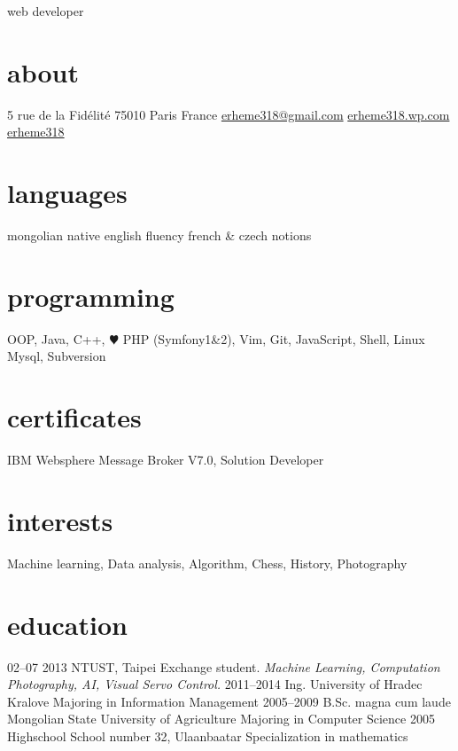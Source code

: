 \documentclass[backend=biber, print]{friggeri-cv}
\begin{document}
       {web developer}


\begin{aside}
  \section{about}
    5 rue de la Fidélité
    75010 Paris
    France
    \href{mailto:erheme318@gmail.com}{erheme318@gmail.com}
    \href{http://erheme318.wordpress.com}{erheme318.wp.com}
    \href{http://github.com/erheme318}{erheme318}
  \section{languages}
    mongolian native
    english fluency
    french \& czech notions
  \section{programming}
    {OOP,
    Java, C++, \color{red} $\varheartsuit$} PHP (Symfony1\&2), Vim, Git, JavaScript, Shell, Linux
    Mysql, Subversion
  \section{certificates}
    IBM Websphere Message Broker V7.0, Solution Developer
\end{aside}

\section{interests}

Machine learning, Data analysis, Algorithm, Chess, History, Photography
\section{education}

\begin{entrylist}
  \entry
    {02–07 2013}
    {NTUST, Taipei}
    {Exchange student.}
    {\emph{Machine Learning, Computation Photography, AI, Visual Servo Control.}}
  \entry
    {2011–2014}
    {Ing.}
    {University of Hradec Kralove}
    {Majoring in Information Management}
  \entry
    {2005–2009}
    {B.Sc. magna cum laude}
    {Mongolian State University of Agriculture}
    {Majoring in Computer Science}
  \entry
    {2005}
    {Highschool}
    {School number 32, Ulaanbaatar}
    {Specialization in mathematics}
\end{entrylist}
\end{document}
